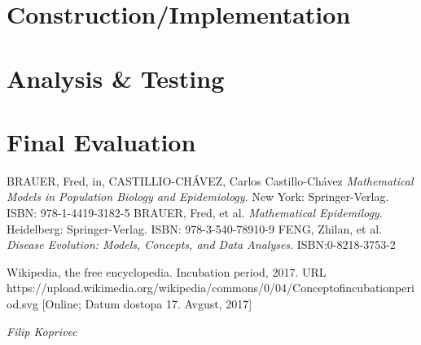 \documentclass[a4paper, 11pt]{article}
\begin{document}
\section*{Construction/Implementation}
\lipsum[5]

\section*{Analysis \& Testing}
\lipsum[6]

\section*{Final Evaluation}
\lipsum[7]


\begin{thebibliography}{9}
 BRAUER, Fred, in, CASTILLIO-CHÁVEZ, Carlos Castillo-Chávez \emph{Mathematical Models in Population Biology and Epidemiology}. New York: Springer-Verlag. ISBN: 978-1-4419-3182-5
  BRAUER, Fred, et al. \emph{Mathematical Epidemilogy}. Heidelberg: Springer-Verlag. ISBN: 978-3-540-78910-9
 FENG, Zhilan, et al. \emph{Disease Evolution: Models, Concepts, and Data Analyses}. ISBN:0-8218-3753-2

 Wikipedia, the free encyclopedia. Incubation period, 2017. URL https://upload.wikimedia.org/wikipedia/commons/0/04/Concept\textunderscore of\textunderscore incubation\textunderscore period.svg [Online; Datum dostopa 17. Avgust, 2017]
\end{thebibliography}


\hfill \textit{Filip Koprivec}
\end{document}
